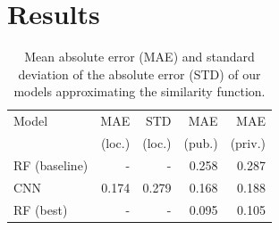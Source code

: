 \documentclass[10pt,conference,compsocconf]{IEEEtran}
\begin{document}








\section{Results}
\label{sec:results}

\begin{table}\centering
    \begin{tabular}{lrr|rr}
    \toprule
        Model           & MAE           & STD           &  MAE          &  MAE \\
                        & (loc.)        & (loc.)        & (pub.)        & (priv.) \\
    \midrule
        RF (baseline)   & -             & -             & \SI{0.258}{}  & \SI{0.287}{} \\
        CNN             & \SI{0.174}{}  & \SI{0.279}{}  & \SI{0.168}{}  & \SI{0.188}{} \\
        RF (best)       & -             & -             & \SI{0.095}{}  & \SI{0.105}{} \\
    \bottomrule
    \end{tabular}
\caption{Mean absolute error (MAE) and standard deviation of the absolute error (STD) of our models approximating the similarity function.}
\label{tab:SFA_MSS}
\end{table}
\end{document}
